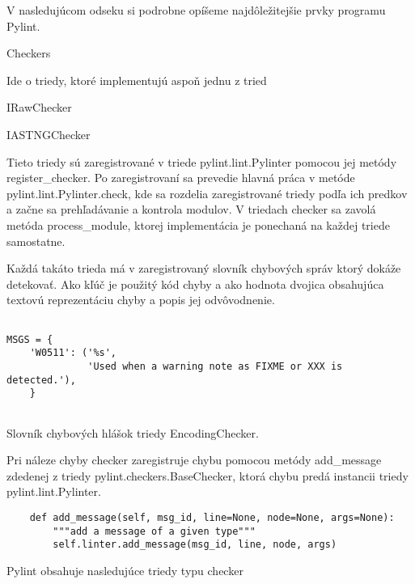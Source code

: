 \documentclass[11pt,oneside,final]{fithesis2}
\begin{document}
		V nasledujúcom odseku si podrobne opíšeme najdôležitejšie prvky programu Pylint.
		
    \begin{list}{•}{}
		\item Checkers 
		
		Ide o triedy, ktoré implementujú aspoň jednu z tried
		
			    \begin{list}{•}{}
					\item IRawChecker
					\item IASTNGChecker
    			\end{list}		
		
		Tieto triedy sú zaregistrované v triede pylint.lint.Pylinter pomocou jej metódy register\_checker.	Po zaregistrovaní sa prevedie hlavná práca v metóde pylint.lint.Pylinter.check, kde sa rozdelia zaregistrované triedy podľa ich predkov a začne sa prehľadávanie a kontrola modulov. V triedach checker sa zavolá metóda process\_module, ktorej implementácia je ponechaná na každej triede samostatne.
		
		Každá takáto trieda má v zaregistrovaný slovník chybových správ ktorý dokáže detekovať. Ako kľúč je použitý kód chyby a ako hodnota dvojica obsahujúca textovú reprezentáciu chyby a popis jej odvôvodnenie.

\begin{lstlisting}

MSGS = {
    'W0511': ('%s',
              'Used when a warning note as FIXME or XXX is detected.'),
    }
		
\end{lstlisting}		

Slovník chybových hlášok triedy EncodingChecker.


Pri náleze chyby checker zaregistruje chybu pomocou metódy add\_message zdedenej z triedy pylint.checkers.BaseChecker, ktorá chybu predá instancii triedy pylint.lint.Pylinter.

\begin{lstlisting}
    def add_message(self, msg_id, line=None, node=None, args=None):
        """add a message of a given type"""
        self.linter.add_message(msg_id, line, node, args)
\end{lstlisting}

		Pylint obsahuje nasledujúce triedy typu checker
		

\end{list}
\end{document}
